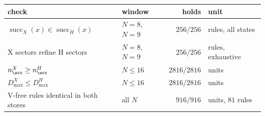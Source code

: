 \begin{tabular}{llrl}
\hline
check & window & holds & unit \\
\hline
$\operatorname{succ}_X(x)\in\operatorname{succ}_H(x)$ & $N=8$, $N=9$ & $256/256$ & rules, all states \\
X sectors refine H sectors & $N=8$, $N=9$ & $256/256$ & rules, exhaustive \\
$n_\wcc^X\ge n_\wcc^H$ & $N\le16$ & $2816/2816$ & units \\
$D_{\max}^X\le D_{\max}^H$ & $N\le16$ & $2816/2816$ & units \\
V-free rules identical in both stores & all $N$ & $916/916$ & units, $81$ rules \\
\hline
\end{tabular}

